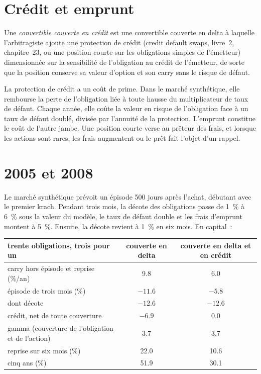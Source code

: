\section{Crédit et emprunt}

\begin{definition}\label{def:s2:convertible-arbitrage:credit}
Une \emph{convertible couverte en crédit} est une convertible couverte en delta à laquelle l'arbitragiste ajoute une protection de crédit
(credit default swaps, livre~2, chapitre~23, ou une position courte sur les obligations simples de l'émetteur) dimensionnée sur la sensibilité de l'obligation au crédit de l'émetteur,
de sorte que la position conserve sa valeur d'option et son carry sans le risque de défaut.
\end{definition}

La protection de crédit a un coût de prime. Dans le marché synthétique, elle rembourse la perte de l'obligation liée à toute hausse du multiplicateur de taux de défaut. Chaque année, elle coûte
la valeur en risque de l'obligation face à un taux de défaut doublé, divisée par l'annuité de la protection. L'emprunt constitue le coût de l'autre jambe. Une position courte verse au prêteur des
frais, et lorsque les actions sont rares, les frais augmentent ou le prêt fait l'objet d'un rappel.

\section{2005 et 2008}

Le marché synthétique prévoit un épisode 500 jours après l'achat, débutant avec le premier krach. Pendant trois mois, la décote des obligations passe de 1~\% à 6~\%
sous la valeur du modèle, le taux de défaut double et les frais d'emprunt montent à 5~\%. Ensuite, la décote revient à 1~\% en six mois. En capital~:

\begin{center}
\small
\begin{tabular}{@{}lcc@{}}
\toprule
trente obligations, trois pour un & couverte en delta & couverte en delta et en crédit\\
\midrule
carry hors épisode et reprise (\%/an) & 9.8 & 6.0\\
épisode de trois mois (\%) & $-11.6$ & $-5.8$\\
\quad dont décote & $-12.6$ & $-12.6$\\
\quad crédit, net de toute couverture & $-6.9$ & 0.0\\
\quad gamma (couverture de l'obligation et de l'action) & 3.7 & 3.7\\
reprise sur six mois (\%) & 22.0 & 10.6\\
cinq ans (\%) & 51.9 & 30.1\\
\bottomrule
\end{tabular}
\end{center}

